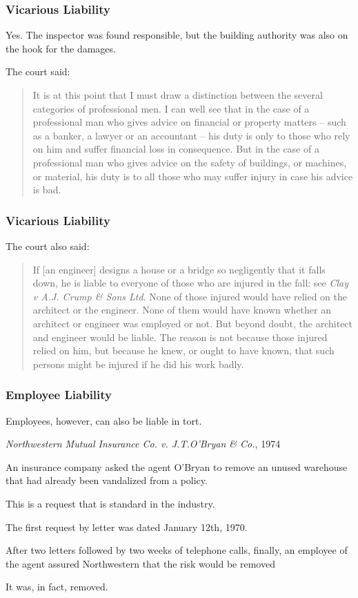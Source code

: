 \begin{frame}
\frametitle{Vicarious Liability}

Yes. The inspector was found responsible, but the building authority was also on the hook for the damages.

The court said:

\begin{quote}
It is at this point that I must draw a distinction between the several categories of professional men.  I can well see that in the case of a professional man who gives advice on financial or property matters -- such as a banker, a lawyer or an accountant -- his duty is only to those who rely on him and suffer financial loss in consequence.  But in the case of a professional man who gives advice on the safety of buildings, or machines, or material, his duty is to all those who may suffer injury in case his advice is bad.
\end{quote}

\end{frame}



\begin{frame}
\frametitle{Vicarious Liability}

The court also said:

\begin{quote}
If [an engineer] designs a house or a bridge so negligently that it falls down, he is liable to everyone of those who are injured in the fall:  see \textit{Clay v A.J. Crump \& Sons Ltd}.  None of those injured would have relied on the architect or the engineer.  None of them would have known whether an architect or engineer was employed or not.  But beyond doubt, the architect and engineer would be liable.  The reason is not because those injured relied on him, but because he knew, or ought to have known, that such persons might be injured if he did his work badly.
\end{quote}


\end{frame}




\begin{frame}
\frametitle{Employee Liability}


Employees, however, can also be liable in tort. 

\textit{Northwestern Mutual Insurance Co. v. J.T.O'Bryan \& Co.}, 1974

An insurance company asked the agent O'Bryan to remove an unused warehouse that had already been vandalized from a policy. 

This is a request that is standard in the industry.

The first request by letter was dated January 12th, 1970.

After two letters followed by two weeks of telephone calls, finally, an employee of the agent assured Northwestern that the risk would be removed 

It was, in fact, removed.

\end{frame}




